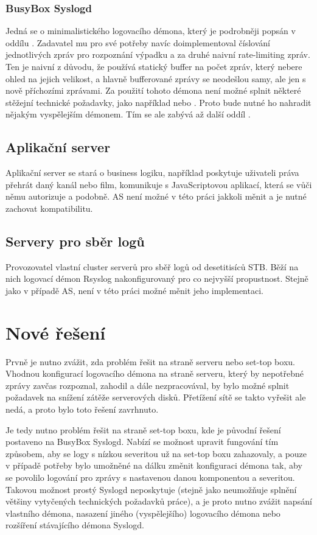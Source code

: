 \documentclass[thesis=B,czech]{FITthesis}[2012/06/26]
\begin{document}
\subsubsection{BusyBox Syslogd}
Jedná se o minimalistického logovacího démona, který je podrobněji popsán v oddílu .
Zadavatel mu pro své potřeby navíc doimplementoval číslování jednotlivých zpráv pro rozpoznání výpadku a za druhé naivní rate-limiting zpráv. Ten je naivní z důvodu, že používá statický buffer na počet zpráv, který nebere ohled na jejich velikost, a hlavně bufferované zprávy se neodešlou samy, ale jen s nově příchozími zprávami.
Za použití tohoto démona není možné splnit některé stěžejní technické požadavky, jako například  nebo . Proto bude nutné ho nahradit nějakým vyspělejším démonem. Tím se ale zabývá až další oddíl .

\subsection{Aplikační server}
Aplikační server se stará o business logiku, například poskytuje uživateli práva přehrát daný kanál nebo film, komunikuje s JavaScriptovou aplikací, která se vůči němu autorizuje a podobně.
AS není možné v této práci jakkoli měnit a je nutné zachovat kompatibilitu.

\subsection{Servery pro sběr logů}
Provozovatel vlastní cluster serverů pro sběř logů od desetitisíců STB. Běží na nich logovací démon Rsyslog nakonfigurovaný pro co nejvyšší propustnost. Stejně jako v případě AS, není v této práci možné měnit jeho implementaci.

\section{Nové řešení}
Prvně je nutno zvážit, zda problém řešit na straně serveru nebo set-top boxu. Vhodnou konfigurací logovacího démona na straně serveru, který by nepotřebné zprávy zavčas rozpoznal, zahodil a dále nezpracovával, by bylo možné splnit požadavek na snížení zátěže serverových disků. Přetížení sítě se takto vyřešit ale nedá, a proto bylo toto řešení zavrhnuto.

Je tedy nutno problém řešit na straně set-top boxu, kde je původní řešení postaveno na BusyBox Syslogd. Nabízí se možnost upravit fungování tím způsobem, aby se logy s nízkou severitou už na set-top boxu zahazovaly, a pouze v případě potřeby bylo umožněné na dálku změnit konfiguraci démona tak, aby se povolilo logování pro zprávy s nastavenou danou komponentou a severitou. Takovou možnost prostý Syslogd neposkytuje (stejně jako neumožňuje splnění většiny vytyčených technických požadavků práce), a je proto nutno zvážit napsání vlastního démona, nasazení jiného (vyspělejšího) logovacího démona nebo rozšíření stávajícího démona Syslogd.
\end{document}
